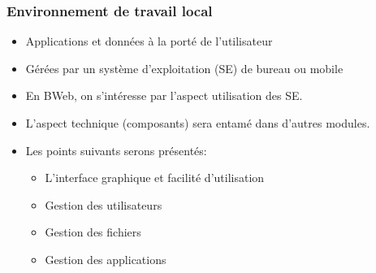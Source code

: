 \documentclass[xcolor=table]{beamer}
\begin{document}
\begin{frame}
\frametitle{Environnement de travail local}

\begin{itemize}
	\item Applications et données à la porté de l'utilisateur 
	\item Gérées par un système d'exploitation (SE) de bureau ou mobile 
	\item En BWeb, on s'intéresse par l'aspect utilisation des SE. 
	\item L'aspect technique (composants) sera entamé dans d'autres modules. 
	\item Les points suivants serons présentés:
	\begin{itemize}
		\item L'interface graphique et facilité d'utilisation 
		\item Gestion des utilisateurs
		\item Gestion des fichiers
		\item Gestion des applications
	\end{itemize}
	
\end{itemize}

\end{frame}
\end{document}
